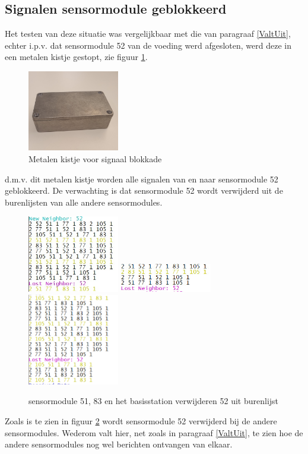 \documentclass[a4paper, 11pt]{article}
\begin{document}
\subsection{Signalen sensormodule geblokkeerd}
Het testen van deze situatie was vergelijkbaar met die van paragraaf \ref{ValtUit}, echter i.p.v. dat sensormodule 52 van de voeding werd afgesloten, werd deze in een metalen kistje gestopt, zie figuur \ref{kistje}. 
\newpage
\begin{figure}[h!p]
	\centering
	\includegraphics[width=4cm]{media/kistje.jpg}
	\caption{Metalen kistje voor signaal blokkade} \label{kistje}
\end{figure}
d.m.v. dit metalen kistje worden alle signalen van en naar sensormodule 52 geblokkeerd. De verwachting is dat sensormodule 52 wordt verwijderd uit de burenlijsten van alle andere sensormodules.
\begin{figure}[h!p]
	\centering
	\includegraphics[width=4cm]{TestResults/FaradayKooi/51_Blokkade.jpeg}\hfill
	\includegraphics[width=4cm]{TestResults/FaradayKooi/83_Blokkade.jpeg}\hfill
	\includegraphics[width=4cm]{TestResults/FaradayKooi/105_verliest_52.png}
	\caption{sensormodule 51, 83 en het basisstation verwijderen 52 uit burenlijst} \label{faradayBlock}
\end{figure}
Zoals is te zien in figuur \ref{faradayBlock} wordt sensormodule 52 verwijderd bij de andere sensormodules. Wederom valt hier, net zoals in paragraaf \ref{ValtUit}, te zien hoe de andere sensormodules nog wel berichten ontvangen van elkaar.
\end{document}
